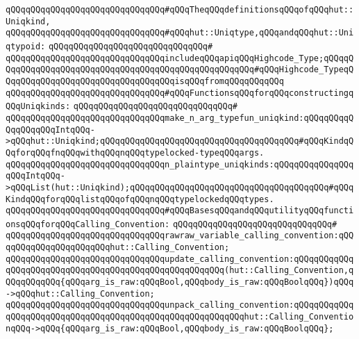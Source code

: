 \newline
\newline
\verb|qQQqqQQqqQQqqQQqqQQqqQQqqQQqqQQq#qQQqTheqQQqdefinitionsqQQqofqQQqhut::Uniqkind,|\newline
\verb|qQQqqQQqqQQqqQQqqQQqqQQqqQQqqQQq#qQQqhut::Uniqtype,qQQqandqQQqhut::Uniqtypoid:|\newline
\verb|qQQqqQQqqQQqqQQqqQQqqQQqqQQqqQQq#|\newline
\verb|qQQqqQQqqQQqqQQqqQQqqQQqqQQqqQQqincludeqQQqapiqQQqHighcode_Type;qQQqqQQqqQQqqQQqqQQqqQQqqQQqqQQqqQQqqQQqqQQqqQQqqQQqqQQq#qQQqHighcode_TypeqQQqqQQqqQQqqQQqqQQqqQQqqQQqqQQqqQQqisqQQqfromqQQqqQQqqQQq|\newline
\newline
\verb|qQQqqQQqqQQqqQQqqQQqqQQqqQQqqQQq#qQQqFunctionsqQQqforqQQqconstructingqQQqUniqkinds:|\newline
\verb|qQQqqQQqqQQqqQQqqQQqqQQqqQQqqQQq#|\newline
\verb|qQQqqQQqqQQqqQQqqQQqqQQqqQQqqQQqmake_n_arg_typefun_uniqkind:qQQqqQQqqQQqqQQqqQQqIntqQQq->qQQqhut::Uniqkind;qQQqqQQqqQQqqQQqqQQqqQQqqQQqqQQqqQQqqQQq#qQQqKindqQQqforqQQqfnqQQqwithqQQqnqQQqtypelocked-typeqQQqargs.|\newline
\verb|qQQqqQQqqQQqqQQqqQQqqQQqqQQqqQQqn_plaintype_uniqkinds:qQQqqQQqqQQqqQQqqQQqIntqQQq->qQQqList(hut::Uniqkind);qQQqqQQqqQQqqQQqqQQqqQQqqQQqqQQqqQQqqQQq#qQQqKindqQQqforqQQqlistqQQqofqQQqnqQQqtypelockedqQQqtypes.|\newline
\newline
\verb|qQQqqQQqqQQqqQQqqQQqqQQqqQQqqQQq#qQQqBasesqQQqandqQQqutilityqQQqfunctionsqQQqforqQQqCalling_Convention:|\newline
\verb|qQQqqQQqqQQqqQQqqQQqqQQqqQQqqQQq#|\newline
\verb|qQQqqQQqqQQqqQQqqQQqqQQqqQQqqQQqrawraw_variable_calling_convention:qQQqqQQqqQQqqQQqqQQqqQQqhut::Calling_Convention;|\newline
\verb|qQQqqQQqqQQqqQQqqQQqqQQqqQQqqQQqupdate_calling_convention:qQQqqQQqqQQqqQQqqQQqqQQqqQQqqQQqqQQqqQQqqQQqqQQqqQQqqQQq(hut::Calling_Convention,qQQqqQQqqQQq{qQQqarg_is_raw:qQQqBool,qQQqbody_is_raw:qQQqBoolqQQq})qQQq->qQQqhut::Calling_Convention;|\newline
\verb|qQQqqQQqqQQqqQQqqQQqqQQqqQQqqQQqunpack_calling_convention:qQQqqQQqqQQqqQQqqQQqqQQqqQQqqQQqqQQqqQQqqQQqqQQqqQQqqQQqqQQqhut::Calling_ConventionqQQq->qQQq{qQQqarg_is_raw:qQQqBool,qQQqbody_is_raw:qQQqBoolqQQq};|\newline
